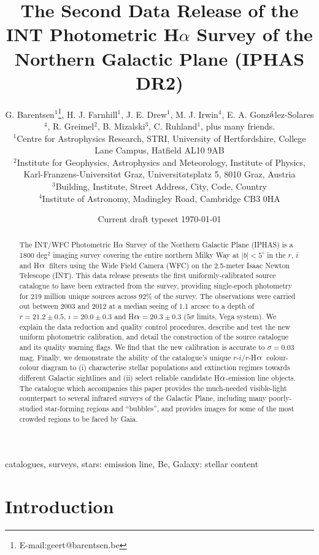 \documentclass[useAMS,usenatbib]{mn2e}
\title[IPHAS Data Release 2]{The Second Data Release 
of the INT Photometric H$\alpha$ Survey 
of the Northern Galactic Plane (IPHAS DR2)}
\author[G. Barentsen
et. al]{G. Barentsen$^{1}$\thanks{E-mail:geert@barentsen.be},
H. J. Farnhill$^{1}$,
J. E. Drew$^{1}$,
M. J. Irwin$^{4}$, \newauthor
E. A. Gonz$\acute{\rm{a}}$lez-Solares$^{4}$,
R. Greimel$^{2}$,
B. Mizalski$^{3}$,
C. Ruhland$^{1}$, \newauthor plus many friends.
\newauthor\\
$^{1}$Centre for Astrophysics Research, STRI, University of Hertfordshire, College Lane Campus, Hatfield AL10 9AB\\
$^{2}$Institute for Geophysics, Astrophysics and Meteorology, Institute of Physics, Karl-Franzens-Universit$\ddot{a}$t Graz, Universit$\ddot{a}$tsplatz 5, 8010 Graz, Austria\\
$^{3}$Building, Institute, Street Address, City, Code, Country\\
$^{4}$Institute of Astronomy, Madingley Road, Cambridge CB3 0HA}
\def\ha{\mbox{H$\rm \alpha$}}
\begin{document}
\date{Current draft typeset \today}
\pagerange{\pageref{firstpage}--\pageref{lastpage}} 

\maketitle

\label{firstpage}

\begin{abstract} %
The INT/WFC Photometric H$\alpha$ Survey 
of the Northern Galactic Plane (IPHAS)
is a 1800 deg$^2$ imaging survey
covering the entire northern Milky Way at $|b| < 5^\circ$
in the $r$, $i$ and \ha\ filters 
using the Wide Field Camera (WFC) 
on the 2.5-meter Isaac Newton Telescope (INT).
This data release presents the first 
uniformly-calibrated source catalogue
to have been extracted from the survey,
providing single-epoch photometry
for 219 million unique sources
across 92\% of the survey.
The observations were carried out between 2003 and 2012
at a median seeing of 1.1 arcsec
to a depth of $r=21.2\pm 0.5$, $i=20.0\pm 0.3$ and \ha$=20.3\pm 0.3$
($5\sigma$ limits, Vega system).
We explain the data reduction 
and quality control procedures,
describe and test the new uniform photometric calibration,
and detail the construction of the source catalogue
and its quality warning flags.
We find that the new calibration is accurate to
$\sigma=0.03$ mag.
Finally, we demonstrate the ability of the 
catalogue's unique
$r$-$i$/$r$-\ha\ colour-colour diagram to
(i) characterise stellar populations and extinction regimes
towards different Galactic sightlines
and (ii) select reliable candidate \ha-emission line objects.
The catalogue which accompanies this paper
provides the much-needed visible-light counterpart
to several infrared surveys of the Galactic Plane,
including many poorly-studied star-forming regions and ``bubbles'',
and provides images for some of the most
crowded regions to be faced by Gaia.
\end{abstract}

\begin{keywords}
catalogues, surveys, stars: emission line, Be, Galaxy: stellar content
\end{keywords}

\section{Introduction}
\end{document}
